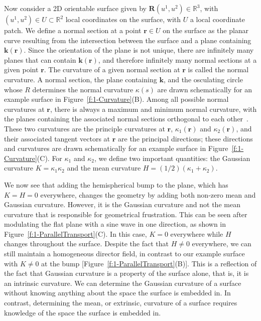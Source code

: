 Now consider a 2D orientable surface given by $\mathbf{R}(u^1,u^2) \in \mathbb{R}^3$, with $(u^1,u^2) \in U \subset \mathbb{R}^2$ local coordinates on the surface, with $U$ a local coordinate patch.
We define a normal section at a point $\mathbf{r} \in U$ on the surface as the planar curve resulting from the intersection between the surface and a plane containing $\mathbf{k}(\mathbf{r})$.
Since the orientation of the plane is not unique, there are infinitely many planes that can contain $\mathbf{k}(\mathbf{r})$, and therefore infinitely many normal sections at a given point $\mathbf{r}$.
The curvature of a given normal section at $\mathbf{r}$ is called the normal curvature.
A normal section, the plane containing $\mathbf{k}$, and the osculating circle whose $R$ determines the normal curvature $\kappa(s)$ are drawn schematically for an example surface in Figure~\ref{f:1-Curvature}(B).
Among all possible normal curvatures at $\mathbf{r}$, there is always a maximum and minimum normal curvature, with the planes containing the associated normal sections orthogonal to each other~\cite{RN35}.
These two curvatures are the principle curvatures at $\mathbf{r}$, $\kappa_1 (\mathbf{r})$ and $\kappa_2(\mathbf{r})$, and their associated tangent vectors at $\mathbf{r}$ are the principal directions; these directions and curvatures are drawn schematically for an example surface in Figure~\ref{f:1-Curvature}(C).
For $\kappa_1$ and $\kappa_2$, we define two important quantities: the Gaussian curvature $K  = \kappa_1 \kappa_2$ and the mean curvature $H = (1/2) (\kappa_1+\kappa_2)$.

We now see that adding the hemispherical bump to the plane, which has $K = H = 0$ everywhere, changes the geometry by adding both non-zero mean and Gaussian curvature.
However, it is the Gaussian curvature and not the mean curvature that is responsible for geometrical frustration.
This can be seen after modulating the flat plane with a sine wave in one direction, as shown in Figure~\ref{f:1-ParallelTransport}(C).
In this case, $K=0$ everywhere while $H$ changes throughout the surface.
Despite the fact that $H \neq 0$ everywhere, we can still maintain a homogeneous director field, in contrast to our example surface with $K \neq 0$ at the bump [Figure~\ref{f:1-ParallelTransport}(B)].
This is a reflection of the fact that Gaussian curvature is a property of the surface alone, that is, it is an intrinsic curvature.
We can determine the Gaussian curvature of a surface without knowing anything about the space the surface is embedded in.
In contrast, determining the mean, or extrinsic, curvature of a surface requires knowledge of the space the surface is embedded in.

